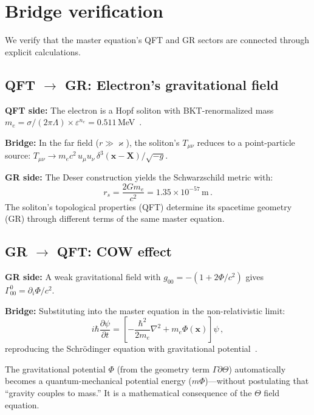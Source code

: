 \documentclass[twocolumn,preprintnumbers,amsmath,amssymb,prd]{revtex4-2}
\begin{document}
\section{Bridge verification}
\label{sec:bridge}

We verify that the master equation's QFT and GR sectors are connected through explicit calculations.

\subsection{QFT $\to$ GR: Electron's gravitational field}

\textbf{QFT side:} The electron is a Hopf soliton with BKT-renormalized mass $m_e = \sigma/(2\pi\Lambda)\times\varepsilon^{n_e} = 0.511\,$MeV~\cite{Paper3}.

\textbf{Bridge:} In the far field ($r \gg \varkappa$), the soliton's $T_{\mu\nu}$ reduces to a point-particle source: $T_{\mu\nu} \to m_e c^2\,u_\mu u_\nu\,\delta^3(\mathbf{x}-\mathbf{X})/\sqrt{-g}$.

\textbf{GR side:} The Deser construction yields the Schwarzschild metric with:
\begin{equation}
r_s = \frac{2Gm_e}{c^2} = 1.35\times10^{-57}\,\text{m}\,.
\end{equation}
The soliton's topological properties (QFT) determine its spacetime geometry (GR) through different terms of the same master equation.

\subsection{GR $\to$ QFT: COW effect}

\textbf{GR side:} A weak gravitational field with $g_{00} = -(1 + 2\Phi/c^2)$ gives $\Gamma^0_{00} = \partial_i\Phi/c^2$.

\textbf{Bridge:} Substituting into the master equation in the non-relativistic limit:
\begin{equation}
i\hbar\frac{\partial\psi}{\partial t} = \left[-\frac{\hbar^2}{2m_e}\nabla^2 + m_e\Phi(\mathbf{x})\right]\psi\,,
\end{equation}
reproducing the Schr\"odinger equation with gravitational potential~\cite{COW1975}.

The gravitational potential $\Phi$ (from the geometry term $\Gamma\partial\Theta$) automatically becomes a quantum-mechanical potential energy ($m\Phi$)---without postulating that ``gravity couples to mass.''
It is a mathematical consequence of the $\Theta$ field equation.
\end{document}
